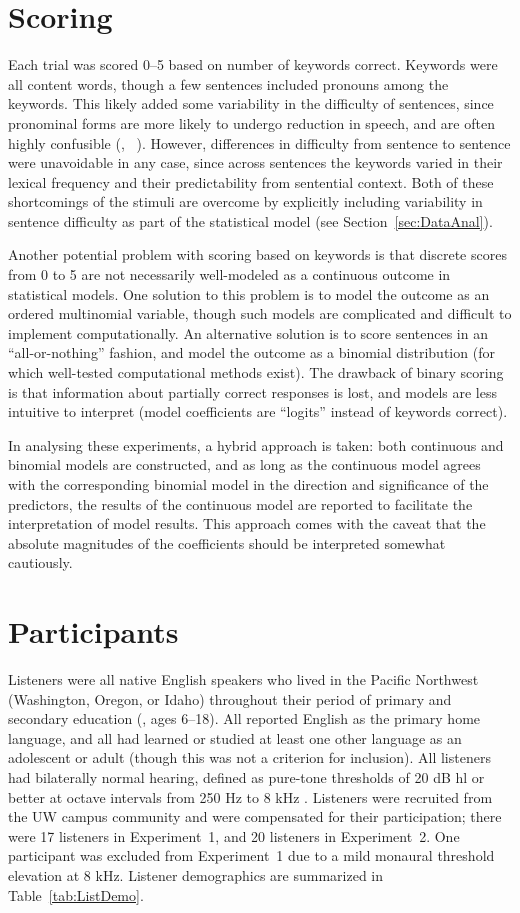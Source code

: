 \section{Scoring\label{sec:Scoring}}
Each trial was scored 0–5 based on number of keywords correct.  Keywords were all content words, though a few sentences included pronouns among the keywords.  This likely added some variability in the difficulty of sentences, since pronominal forms are more likely to undergo reduction in speech, and are often highly confusible (\eg,  \vs\ ).  However, differences in difficulty from sentence to sentence were unavoidable in any case, since across sentences the keywords varied in their lexical frequency and their predictability from sentential context.  Both of these shortcomings of the stimuli are overcome by explicitly including variability in sentence difficulty as part of the statistical model (see Section~\ref{sec:DataAnal}).

Another potential problem with scoring based on keywords is that discrete scores from 0 to 5 are not necessarily well-modeled as a continuous outcome in statistical models.  One solution to this problem is to model the outcome as an ordered multinomial variable, though such models are complicated and difficult to implement computationally.  An alternative solution is to score sentences in an “all-or-nothing” fashion, and model the outcome as a binomial distribution (for which well-tested computational methods exist).  The drawback of binary scoring is that information about partially correct responses is lost, and models are less intuitive to interpret (model coefficients are “logits” instead of keywords correct).

In analysing these experiments, a hybrid approach is taken: both continuous and binomial models are constructed, and as long as the continuous model agrees with the corresponding binomial model in the direction and significance of the predictors, the results of the continuous model are reported to facilitate the interpretation of model results.  This approach comes with the caveat that the absolute magnitudes of the coefficients should be interpreted somewhat cautiously.

\section{Participants}
Listeners were all native English speakers who lived in the Pacific Northwest (Washington, Oregon, or Idaho) throughout their period of primary and secondary education (\ie, ages 6–18).  All reported English as the primary home language, and all had learned or studied at least one other language as an adolescent or adult (though this was not a criterion for inclusion).  All listeners had bilaterally normal hearing, defined as pure-tone thresholds of 20 dB \ac{hl} or better at octave intervals from 250 Hz to 8 kHz .  Listeners were recruited from the UW campus community and were compensated for their participation; there were 17 listeners in Experiment~1, and 20 listeners in Experiment~2.  One participant was excluded from Experiment~1 due to a mild monaural threshold elevation at 8 kHz.  Listener demographics are summarized in Table~\ref{tab:ListDemo}.

